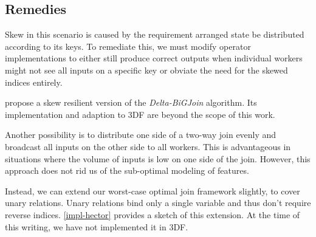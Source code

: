 \documentclass[../catalog.tex]{subfiles}
\begin{document}
\subsection{Remedies}

Skew in this scenario is caused by the requirement arranged state be
distributed according to its keys. To remediate this, we must modify
operator implementations to either still produce correct outputs when
individual workers might not see all inputs on a specific key or
obviate the need for the skewed indices entirely.

\cite{ammar2018distributed} propose a skew resilient version of the
\emph{Delta-BiGJoin} algorithm. Its implementation and adaption to 3DF
are beyond the scope of this work.

Another possibility is to distribute one side of a two-way join evenly
and broadcast all inputs on the other side to all workers. This is
advantageous in situations where the volume of inputs is low on one
side of the join. However, this approach does not rid us of the
sub-optimal modeling of features.

Instead, we can extend our worst-case optimal join framework slightly,
to cover unary relations. Unary relations bind only a single variable
and thus don't require reverse indices. \autoref{impl-hector} provides
a sketch of this extension. At the time of this writing, we have not
implemented it in 3DF.
\end{document}
